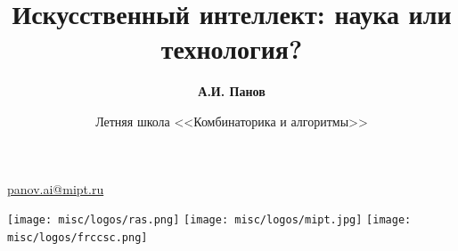 \documentclass[default]{beamer}
\begin{document}
	
	\title[ИИ: наука и технология]{Искусственный интеллект: наука или технология?}
	\author[А.И. Панов]{\textbf{А.И. Панов}}
	\date[19 августа 2018]{Летняя школа <<Комбинаторика и алгоритмы>>} 
	
	{
	\begin{frame}
		
		\titlepage
		\centering
		\href{mailto:panov.ai@mipt.ru}{panov.ai@mipt.ru}
		\par\bigskip
		\texttt{[image: misc/logos/ras.png]} \hspace{10pt}
		\texttt{[image: misc/logos/mipt.jpg]} \hspace{10pt}
		\texttt{[image: misc/logos/frccsc.png]} 
		
	\end{frame}
	}	
\end{document}
